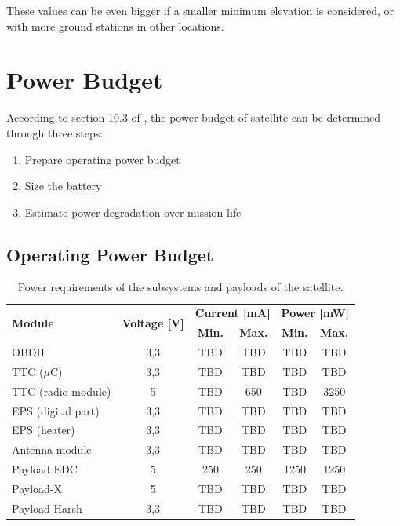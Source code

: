 These values can be even bigger if a smaller minimum elevation is considered, or with more ground stations in other locations.

\section{Power Budget}

According to section 10.3 of \cite{larson2005}, the power budget of satellite can be determined through three steps:

\begin{enumerate}
    \item Prepare operating power budget
    \item Size the battery
    \item Estimate power degradation over mission life
\end{enumerate}

\subsection{Operating Power Budget}

\begin{table}[!h]
    \centering
    \begin{tabular}{lccccc}
        \toprule[1.5pt]
        \multirow{2}{*}{\textbf{Module}} & \multirow{2}{*}{\textbf{Voltage [V]}}    & \multicolumn{2}{c}{\textbf{Current [mA]}} & \multicolumn{2}{c}{\textbf{Power [mW]}} \\
                                         &                                          & \textbf{Min.} & \textbf{Max.}             & \textbf{Min.} & \textbf{Max.} \\
        \midrule
        OBDH                & 3,3   & TBD   & TBD   & TBD   & TBD \\
        TTC ($\mu$C)        & 3,3   & TBD   & TBD   & TBD   & TBD \\
        TTC (radio module)  & 5     & TBD   & 650   & TBD   & 3250 \\
        EPS (digital part)  & 3,3   & TBD   & TBD   & TBD   & TBD \\
        EPS (heater)        & 3,3   & TBD   & TBD   & TBD   & TBD \\
        Antenna module      & 3,3   & TBD   & TBD   & TBD   & TBD \\
        Payload EDC         & 5     & 250   & 250   & 1250  & 1250 \\
        Payload-X           & 5     & TBD   & TBD   & TBD   & TBD \\
        Payload Harsh       & 3,3   & TBD   & TBD   & TBD   & TBD \\
        \bottomrule[1.5pt]
    \end{tabular}
    \caption{Power requirements of the subsystems and payloads of the satellite.}
    \label{tab:power-requirements}
\end{table}

